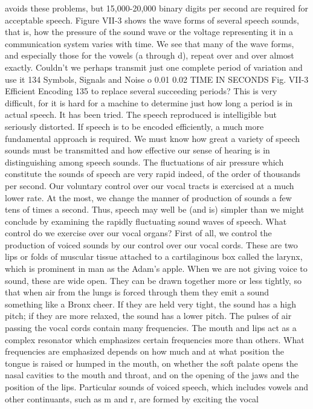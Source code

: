 {{{avoids these problems, but 15,000-20,000 binary digits per second
are required for acceptable speech.
Figure VII-3 shows the wave forms of several speech sounds,
that is, how the pressure of the sound wave or the voltage representing
it in a communication system varies with time. We see that
many of the wave forms, and especially those for the vowels (a
through d), repeat over and over almost exactly. Couldn’t we
perhaps transmit just one complete period of variation and use it
134 Symbols, Signals and Noise
o 0.01 0.02
TIME IN SECONDS
Fig. VII-3
Efficient Encoding 135
to replace several succeeding periods? This is very difficult, for it
is hard for a machine to determine just how long a period is in
actual speech. It has been tried. The speech reproduced is intelligible
but seriously distorted.
If speech is to be encoded efficiently, a much more fundamental
approach is required. We must know how great a variety of speech
sounds must be transmitted and how effective our sense of hearing
is in distinguishing among speech sounds.
The fluctuations of air pressure which constitute the sounds of
speech are very rapid indeed, of the order of thousands per second.
Our voluntary control over our vocal tracts is exercised at a much
lower rate. At the most, we change the manner of production of
sounds a few tens of times a second. Thus, speech may well be
(and is) simpler than we might conclude by examining the rapidly
fluctuating sound waves of speech.
What control do we exercise over our vocal organs? First of all,
we control the production of voiced sounds by our control over our
vocal cords. These are two lips or folds of muscular tissue attached
to a cartilaginous box called the larynx, which is prominent in man
as the Adam’s apple. When we are not giving voice to sound, these
are wide open. They can be drawn together more or less tightly,
so that when air from the lungs is forced through them they emit
a sound something like a Bronx cheer. If they are held very tight,
the sound has a high pitch; if they are more relaxed, the sound has
a lower pitch.
The pulses of air passing the vocal cords contain many frequencies.
The mouth and lips act as a complex resonator which emphasizes
certain frequencies more than others. What frequencies are
emphasized depends on how much and at what position the tongue
is raised or humped in the mouth, on whether the soft palate opens
the nasal cavities to the mouth and throat, and on the opening of
the jaws and the position of the lips.
Particular sounds of voiced speech, which includes vowels and
other continuants, such as m and r, are formed by exciting the vocal
}}}
